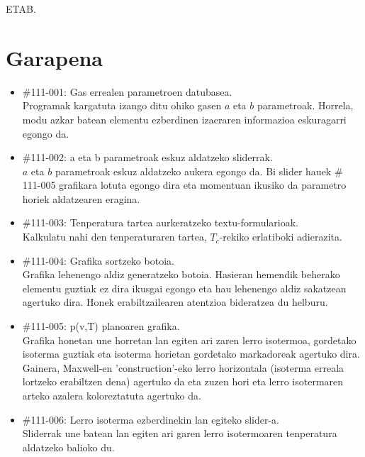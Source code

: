 \documentclass[10pt,a4paper]{article}
\let\nf\normalfont %
\newcommand{\cf}{\normalfont\sffamily}
\begin{document}

ETAB. 
\section{Garapena}

\begin{itemize}

\item \cf \#111-001: Gas errealen parametroen datubasea.
\\
\nf Programak kargatuta izango ditu ohiko gasen $a$ eta $b$ parametroak. Horrela, modu azkar batean elementu ezberdinen izaeraren informazioa eskuragarri egongo da.

\item \cf \#111-002: a eta b parametroak eskuz aldatzeko sliderrak.
\\
\nf $a$ eta $b$ parametroak eskuz aldatzeko aukera egongo da. Bi slider hauek \cf \# 111-005 \nf grafikara lotuta egongo dira eta
momentuan ikusiko da parametro horiek aldatzearen eragina.

\item \cf \#111-003: Tenperatura tartea aurkeratzeko textu-formularioak.
\\
\nf Kalkulatu nahi den tenperaturaren tartea, $T_c$-rekiko erlatiboki adierazita.

\item \cf \#111-004: Grafika sortzeko botoia.
\\
\nf Grafika lehenengo aldiz generatzeko botoia. Hasieran hemendik beherako elementu guztiak ez dira ikusgai egongo eta hau lehenengo aldiz sakatzean agertuko dira. Honek erabiltzailearen atentzioa bideratzea du helburu.

\item \cf \#111-005: p(v,T) planoaren grafika.
\\
\nf Grafika honetan une horretan lan egiten ari zaren lerro isotermoa, gordetako isoterma guztiak eta isoterma horietan gordetako markadoreak agertuko dira. Gainera, Maxwell-en 'construction'-eko lerro horizontala (isoterma erreala lortzeko erabiltzen dena) agertuko da eta zuzen hori eta lerro isotermaren arteko azalera koloreztatuta agertuko da.

\item \cf \#111-006: Lerro isoterma ezberdinekin lan egiteko slider-a.
\\
\nf Sliderrak une batean lan egiten ari garen lerro isotermoaren tenperatura aldatzeko balioko du.


\end{itemize}
\end{document}

